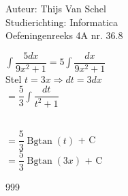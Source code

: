 \documentclass[a4paper]{article}
\begin{document}
  
\noindent \large Auteur: Thijs Van Schel \\
\noindent \large Studierichting: Informatica\\
\noindent \large Oefeningenreeks 4A nr. 36.8\\

\medskip

\normalsize

$\displaystyle\int \dfrac{5dx}{9x^2+1} = 5\displaystyle\int \dfrac{dx}{9x^2+1}$\\

Stel $t = 3x\Rightarrow dt = 3dx$\\

$ = \dfrac{5}{3} \displaystyle\int \dfrac{dt}{t^2+1}$\\\

$ = \dfrac{5}{3} \operatorname{Bgtan}(t)$ + C\\

$ = \dfrac{5}{3} \operatorname{Bgtan}(3x)$ + C


\begin{thebibliography}{999}
\end{thebibliography}
\end{document}
